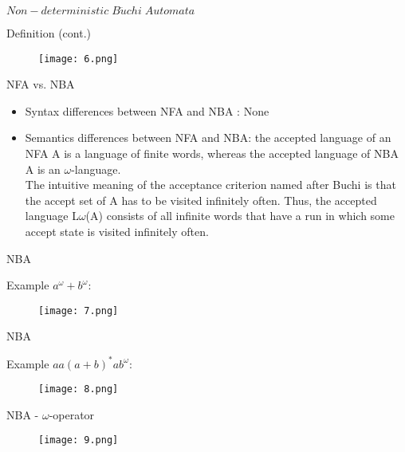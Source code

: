 \documentclass[17pt, t, lualatex]{beamer}
\begin{document}
\begin{frame}{$Non-deterministic\; B\ddot{u}chi\; Automata$}
\begin{block}{Definition (cont.)}
\begin{figure}
    \centering
    \texttt{[image: 6.png]}
\end{figure}
\end{block}
\end{frame}

\begin{frame}{NFA vs. NBA}
\begin{itemize}
    \item Syntax differences between NFA and NBA : None\\
    
    \item Semantics differences between NFA and NBA: the accepted 
language of an NFA A is a language of finite words, whereas the 
accepted language of NBA A is an $\omega$-language. \\

The intuitive meaning of the acceptance criterion named after Buchi is that the accept set of A has to be visited infinitely often. Thus, the accepted language L$\omega$(A) consists of all infinite words that have a run in which some accept state is visited infinitely often.
\end{itemize}
\end{frame}

\begin{frame}{NBA}
\begin{block}{Example}
    $a^{\omega} + b^{\omega}:$
    \begin{figure}
        \centering
        \texttt{[image: 7.png]}
    \end{figure}
\end{block}
\end{frame}

\begin{frame}{NBA}
\begin{block}{Example}
    $aa(a+b)^*ab^{\omega}:$
    \begin{figure}
        \centering
        \texttt{[image: 8.png]}
    \end{figure}
\end{block}
\end{frame}

\begin{frame}{NBA - $\omega$-operator}
    \begin{figure}
        \centering
        \texttt{[image: 9.png]}
    \end{figure}
\end{frame}
\end{document}
